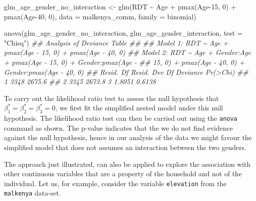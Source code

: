 \documentclass[
  letterpaper,
]{krantz}
\newenvironment{Shaded}{\begin{snugshade}}{\end{snugshade}}
\newcommand{\AttributeTok}[1]{\textcolor[rgb]{0.40,0.45,0.13}{#1}}
\newcommand{\DecValTok}[1]{\textcolor[rgb]{0.68,0.00,0.00}{#1}}
\newcommand{\DocumentationTok}[1]{\textcolor[rgb]{0.37,0.37,0.37}{\textit{#1}}}
\newcommand{\FunctionTok}[1]{\textcolor[rgb]{0.28,0.35,0.67}{#1}}
\newcommand{\NormalTok}[1]{\textcolor[rgb]{0.00,0.23,0.31}{#1}}
\newcommand{\OtherTok}[1]{\textcolor[rgb]{0.00,0.23,0.31}{#1}}
\newcommand{\SpecialCharTok}[1]{\textcolor[rgb]{0.37,0.37,0.37}{#1}}
\newcommand{\StringTok}[1]{\textcolor[rgb]{0.13,0.47,0.30}{#1}}
\begin{document}
\begin{Shaded}
\begin{Highlighting}[]
\NormalTok{glm\_age\_gender\_no\_interaction }\OtherTok{\textless{}{-}} \FunctionTok{glm}\NormalTok{(RDT }\SpecialCharTok{\textasciitilde{}}\NormalTok{ Age }\SpecialCharTok{+}  \FunctionTok{pmax}\NormalTok{(Age}\DecValTok{{-}15}\NormalTok{, }\DecValTok{0}\NormalTok{) }\SpecialCharTok{+} \FunctionTok{pmax}\NormalTok{(Age}\DecValTok{{-}40}\NormalTok{, }\DecValTok{0}\NormalTok{),}
                              \AttributeTok{data =}\NormalTok{ malkenya\_comm, }\AttributeTok{family =}\NormalTok{ binomial)}

\FunctionTok{anova}\NormalTok{(glm\_age\_gender\_no\_interaction, glm\_age\_gender\_interaction, }\AttributeTok{test =} \StringTok{"Chisq"}\NormalTok{)}
\DocumentationTok{\#\# Analysis of Deviance Table}
\DocumentationTok{\#\# }
\DocumentationTok{\#\# Model 1: RDT \textasciitilde{} Age + pmax(Age {-} 15, 0) + pmax(Age {-} 40, 0)}
\DocumentationTok{\#\# Model 2: RDT \textasciitilde{} Age + Gender:Age + pmax(Age {-} 15, 0) + Gender:pmax(Age {-} }
\DocumentationTok{\#\#     15, 0) + pmax(Age {-} 40, 0) + Gender:pmax(Age {-} 40, 0)}
\DocumentationTok{\#\#   Resid. Df Resid. Dev Df Deviance Pr(\textgreater{}Chi)}
\DocumentationTok{\#\# 1      3348     2675.6                     }
\DocumentationTok{\#\# 2      3345     2673.8  3   1.8051   0.6138}
\end{Highlighting}
\end{Shaded}

To carry out the likelihood ratio test to assess the null hypothesis
that \(\beta_{1}^*=\beta_{2}^*=\beta_{3}^*=0\), we first fit the
simplified nested model under this null hypothesis. The likelihood ratio
test can then be carried out using the \texttt{anova} command as shown.
The p-value indicates that the we do not find evidence against the null
hypothesis, hence in our analysis of the data we might favour the
simplified model that does not assumes an interaction between the two
genders.

The approach just illustrated, can also be applied to explore the
association with other continuous variables that are a property of the
household and not of the individual. Let us, for example, consider the
variable \texttt{elevation} from the \texttt{malkenya} data-set.
\end{document}
